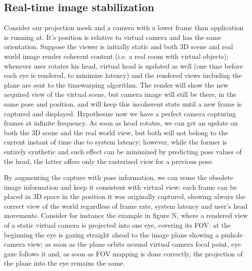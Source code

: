 \subsection{Real-time image stabilization}
Consider our projection mesh and a camera with a lower frame than application is running at. It's position is relative to virtual camera and has the same orientation. Suppose the viewer is initially static and both 3D scene and real world image render coherent content (i.e. a real room with virtual objects); whenever user rotates his head, virtual head is updated as well (one time before each eye is rendered, to minimize latency) and the rendered views including the plane are sent to the timewarping algorithm. The render will show the new acquired view of the virtual scene, but camera image will still be there, in the same pose and position, and will keep this incoherent state until a new frame is captured and displayed. Hypothesize now we have a perfect camera capturing frames at infinite frequency. As soon as head rotates, we can get an update on both the 3D scene and the real world view, but both will not belong to the current instant of time due to system latency; however, while the former is entirely synthetic and such effect can be minimized by predicting pose values of the head, the latter offers only the rasterized view for a previous pose.

By augmenting the capture with pose information, we can reuse the obsolete image information and keep it consistent with virtual view: each frame can be placed in 3D space in the position it was originally captured, showing always the correct view of the world regardless of frame rate, system latency and user's head movements. Consider for instance the example in figure N, where a rendered view of a static virtual camera is projected into one eye, covering its FOV: at the beginning the eye is gazing straight ahead to the image plane showing a pinhole camera view; as soon as the plane orbits around virtual camera focal point, eye gaze follows it and, as soon as FOV mapping is done correctly, the projection of the plane into the eye remains the same.

